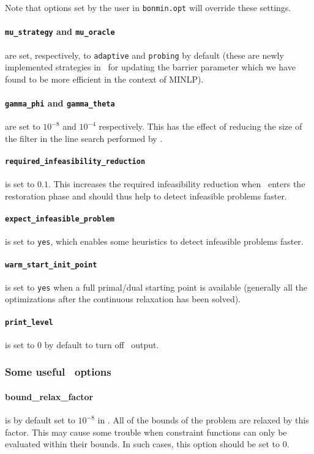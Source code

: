 Note that options set by the user in {\tt bonmin.opt} will override these
settings.

\paragraph{{\tt mu\_strategy} and {\tt mu\_oracle}} are set, respectively, to
{\tt adaptive} and {\tt probing} by default (these are newly implemented strategies in \Ipopt\
for updating the barrier parameter  which we have found to be
more efficient in the context of MINLP).
\paragraph{{\tt gamma\_phi} and {\tt gamma\_theta}} are set to $10^{-8}$ and $10^{-4}$
respectively. This has the effect of reducing the size of the filter in the line search performed by \Ipopt.

\paragraph{\tt required\_infeasibility\_reduction} is set to $0.1$.
This increases the required infeasibility reduction when \Ipopt\ enters the
restoration phase and should thus help to
detect infeasible problems faster.

\paragraph{\tt expect\_infeasible\_problem} is set to {\tt yes}, which enables some heuristics
to detect infeasible problems faster.

\paragraph{\tt warm\_start\_init\_point} is set to {\tt yes} when a full primal/dual starting
point is available (generally all the optimizations after the continuous relaxation has been solved).

\paragraph{\tt print\_level} is set to $0$ by default to turn off \Ipopt\ output.
\subsubsection{Some useful \Ipopt\ options}
\paragraph{bound\_relax\_factor} is by default set to $10^{-8}$ in \Ipopt. All of the bounds
of the problem are relaxed by this factor. This may cause some trouble
when constraint functions can only be evaluated within their bounds.
In such cases, this
option should be set to 0.
